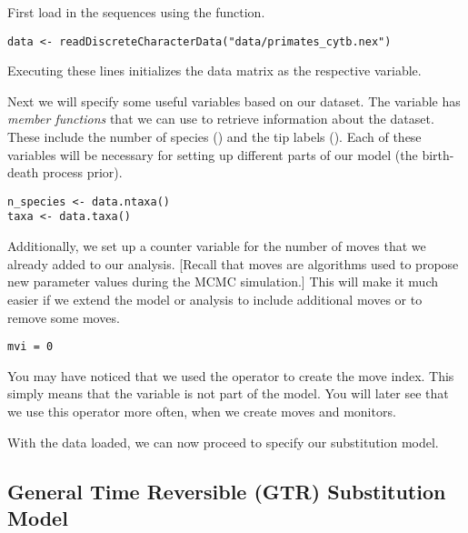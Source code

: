 First load in the sequences using the  function. 
{\tt \begin{snugshade*}
\begin{lstlisting}
data <- readDiscreteCharacterData("data/primates_cytb.nex")
\end{lstlisting}
\end{snugshade*}}
Executing these lines initializes the data matrix as the respective \Rev variable. 

Next we will specify some useful variables based on our dataset. 
The variable  has \textit{member functions} that we can use to retrieve information about the dataset. 
These include the number of species () and the tip labels ().
Each of these variables will be necessary for setting up different parts of our model (\EG the birth-death process prior).
{\tt \begin{snugshade*}
\begin{lstlisting}
n_species <- data.ntaxa()
taxa <- data.taxa()	
\end{lstlisting}
\end{snugshade*}}

Additionally, we set up a counter variable for the number of moves that we already added to our analysis.
[Recall that moves are algorithms used to propose new parameter values during the MCMC simulation.]
This will make it much easier if we extend the model or analysis to include additional moves or to remove some moves.
{\tt \begin{snugshade*}
\begin{lstlisting}
mvi = 0 
\end{lstlisting}
\end{snugshade*}}
You may have noticed that we used the \cl{=} operator to create the move index.
This simply means that the variable is not part of the model.
You will later see that we use this operator more often, \EG when we create moves and monitors.

With the data loaded, we can now proceed to specify our substitution model.



\subsection{General Time Reversible (GTR) Substitution Model}

